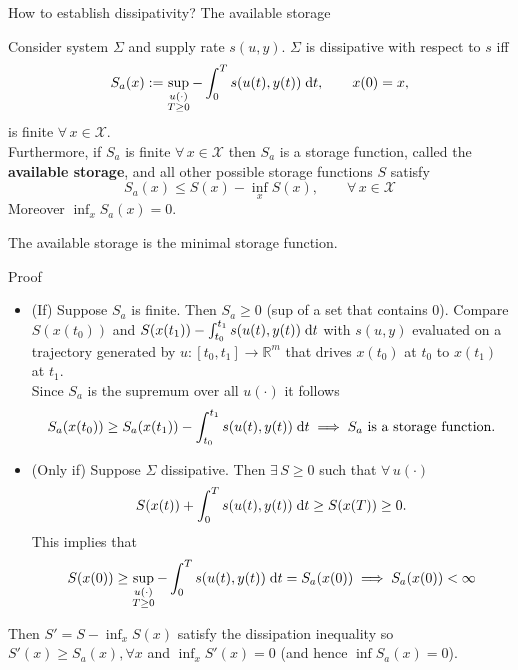 \documentclass[aspectratio=169]{beamer}
\newcommand{\bbR}{\mathbb{R}}
\begin{document}
\begin{frame}{How to establish dissipativity? The available storage}
	
\begin{theorem}
Consider system $\Sigma$ and supply rate $s(u, y)$. $\Sigma$ is dissipative with respect to $s$ iff
\begin{equation}\label{eq:Sa}
	S_a(x):= \sup_{\substack{u(\cdot) \\ T \ge 0}} - \int_0^T s(u(t), y(t)) \d t, \qquad x(0) = x,
\end{equation}
is finite $\forall \, x \in \mathcal{X}$. \\
Furthermore, if $S_a$ is finite $\forall \, x \in \mathcal{X}$ then $S_a$ is a storage function, called the \textbf{available storage}, and all other possible storage functions $S$ satisfy
\begin{equation*}
	S_a(x) \le S(x) - \inf_x S(x), \qquad \forall \,  x \in \mathcal{X}
\end{equation*}
Moreover $\inf_x S_a(x)=0.$
\end{theorem}

The available storage is the minimal storage function.
	
\end{frame}

\begin{frame}{Proof}

		\begin{itemize}
			\item (If) Suppose $S_a$ is finite. Then $S_a \ge 0$ (sup of a set that contains 0).  Compare $S(x(t_0))$ and $S(x(t_1)) - \int_{t_0}^{t_1} s(u(t), y(t))\d t$ with $s(u, y)$ evaluated on a trajectory generated by $u: [t_0, t_1] \rightarrow \bbR^m$ that drives $x(t_0)$ at $t_0$ to $x(t_1)$ at $t_1$. \\
			Since $S_a$ is the supremum over all $u(\cdot)$ it follows
			\begin{equation*}
				S_a(x(t_0)) \ge S_a(x(t_1)) - \int_{t_0}^{t_1} s(u(t), y(t)) \d t \implies S_a \text{ is a storage function.}
			\end{equation*}
			\item (Only if) Suppose $\Sigma$ dissipative. Then $\exists\,  S \ge 0$ such that $\forall \, u(\cdot)$
			\begin{equation*}
				S(x(t)) + \int_0^T s(u(t), y(t)) \d t \ge S(x(T)) \ge 0.
			\end{equation*}
		This implies that $$S(x(0)) \ge \sup_{\substack{u(\cdot) \\ T \ge 0}} - \int_0^T s(u(t), y(t)) \d t = S_a(x(0)) \implies S_a(x(0)) < \infty$$
		\end{itemize}
		Then $S'= S - \inf_x S(x)$ satisfy the dissipation inequality so $S'(x) \ge S_a(x), \forall x$ and $\inf_x S'(x)=0$ (and hence $\inf S_a(x)=0$).
\end{frame}
\end{document}
